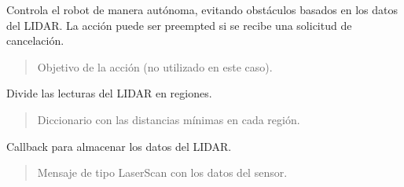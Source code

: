 \documentclass[a4paper,10pt,spanish]{sphinxmanual}
\begin{document}
\begin{fulllineitems}
\begin{fulllineitems}
\sphinxAtStartPar
Controla el robot de manera autónoma, evitando obstáculos basados en los
datos del LIDAR. La acción puede ser preempted si se recibe una solicitud
de cancelación.
\begin{quote}\begin{description}
\sphinxAtStartPar
{} \textendash{} Objetivo de la acción (no utilizado en este caso).

\end{description}\end{quote}

\end{fulllineitems}


\begin{fulllineitems}
\label{\detokenize{squad_autonomous_control_action:squad_autonomous_control_action.AutonomousControlActionServer.get_laser_regions}}
\pysigstartsignatures
{}
\pysigstopsignatures
\sphinxAtStartPar
Divide las lecturas del LIDAR en regiones.
\begin{quote}\begin{description}
\sphinxAtStartPar
Diccionario con las distancias mínimas en cada región.

\end{description}\end{quote}

\end{fulllineitems}


\begin{fulllineitems}
\label{\detokenize{squad_autonomous_control_action:squad_autonomous_control_action.AutonomousControlActionServer.laser_callback}}
\pysigstartsignatures
{}
\pysigstopsignatures
\sphinxAtStartPar
Callback para almacenar los datos del LIDAR.
\begin{quote}\begin{description}
\sphinxAtStartPar
{} \textendash{} Mensaje de tipo LaserScan con los datos del sensor.


\end{description}
\end{quote}
\end{fulllineitems}
\end{fulllineitems}
\end{document}
